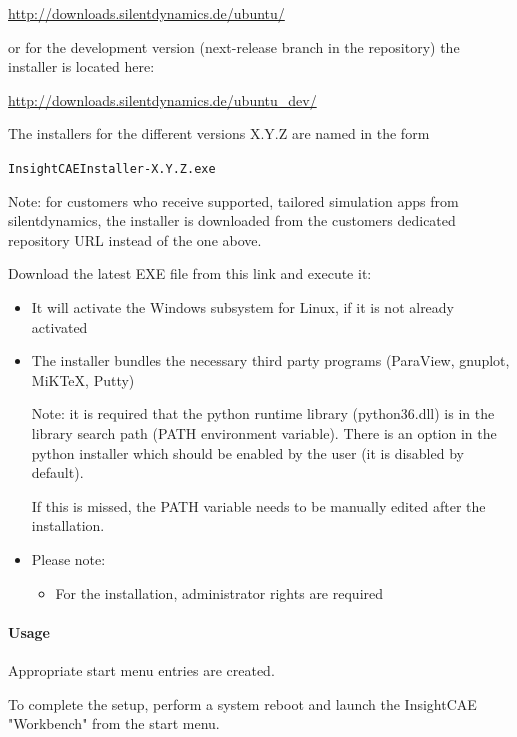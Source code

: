 \url{http://downloads.silentdynamics.de/ubuntu/}

or for the development version (next-release branch in the repository) the installer is located here:

\url{http://downloads.silentdynamics.de/ubuntu_dev/}

The installers for the different versions X.Y.Z are named in the form 

\texttt{InsightCAEInstaller-X.Y.Z.exe}

Note: for customers who receive supported, tailored simulation apps from silentdynamics, the installer is downloaded from the customers dedicated repository URL instead of the one above.

Download the latest EXE file from this link and execute it:

\begin{itemize}
\item It will activate the Windows subsystem for Linux, if it is not already activated
\item The installer bundles the necessary third party programs (ParaView, gnuplot, MiKTeX, Putty)

Note: it is required that the python runtime library (python36.dll) is in the library search path (PATH environment variable). There is an option in the python installer which should be enabled by the user (it is disabled by default). \warningsymbol

If this is missed, the PATH variable needs to be manually edited after the installation.

\item Please note:
\begin{itemize}
\item For the installation, administrator rights are required
\end{itemize}
\end{itemize}

\paragraph{Usage}

Appropriate start menu entries are created.

To complete the setup, perform a system reboot and launch the InsightCAE "Workbench" from the start menu.

